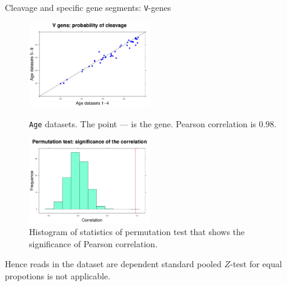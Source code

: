 \documentclass{beamer}\usepackage[]{graphicx}\usepackage[]{color}
\begin{document}
\begin{frame}{Cleavage and specific gene segments: \texttt{V}-genes}
 \begin{figure}[h]
  \begin{minipage}[h]{0.49\linewidth}
    \center\includegraphics[width=150pt]{Vgen_cleavage_age.pdf}
    \caption{\footnotesize{\texttt{Age} datasets. The point --- is the gene. Pearson correlation is $0.98$.}} 
  \end{minipage}
  \hfill
  \begin{minipage}[h]{0.49\linewidth}
   \includegraphics[width=150pt]{Vgen_cleavage_age_correlation.pdf}
    \caption{\footnotesize{Histogram of statistics of permutation test that shows the significance of Pearson correlation.}} 
  \end{minipage}
 \end{figure}
 \pause
 {\color{blue} Hence reads in the dataset are dependent standard pooled $Z$-test for equal propotions is not applicable.}
 
\end{frame}

\end{document}
